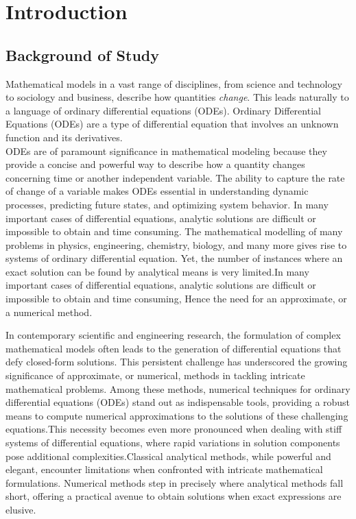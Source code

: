\chapter{Introduction}


\section{Background of Study}
Mathematical models in a vast range of disciplines, from science and technology to sociology and business, describe how quantities \textsl{change}. This leads naturally to a language of ordinary differential equations (ODEs).
Ordinary Differential Equations (ODEs) are a type of differential equation that involves an unknown function and its derivatives. \\
ODEs are of paramount significance in mathematical modeling because they provide a concise and powerful way to describe how a quantity changes concerning time or another independent variable. The ability to capture the rate of change of a variable makes ODEs essential in understanding dynamic processes, predicting future states, and optimizing system behavior.
In many important cases of differential equations, analytic solutions are difficult or impossible to obtain and time
consuming.
The mathematical modelling of many problems in physics, engineering, chemistry, biology, and many more gives rise to systems of ordinary differential equation. Yet, the number of instances where an exact solution can be found by analytical means is very limited\cite{lambert1977}.In many important cases of differential equations, analytic solutions are difficult or impossible to obtain and time
consuming, Hence the need for an approximate, or a numerical method.

In contemporary scientific and engineering research, the formulation of complex mathematical models often leads to the generation of differential equations that defy closed-form solutions. This persistent challenge has underscored the growing significance of approximate, or numerical, methods in tackling intricate mathematical problems. Among these methods, numerical techniques for ordinary differential equations (ODEs) stand out as indispensable tools, providing a robust means to compute numerical approximations to the solutions of these challenging equations.This necessity becomes even more pronounced when dealing with stiff systems of differential equations, where rapid variations in solution components pose additional complexities.Classical analytical methods, while powerful and elegant, encounter limitations when confronted with intricate mathematical formulations. Numerical methods step in precisely where analytical methods fall short, offering a practical avenue to obtain solutions when exact expressions are elusive.

